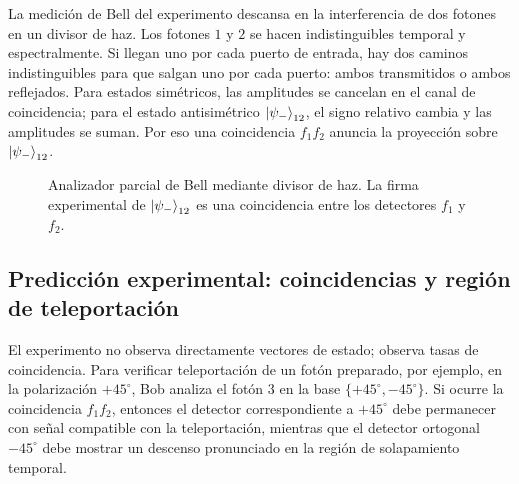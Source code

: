 \documentclass[12pt,a4paper]{article}
\theoremstyle{definition}
\theoremstyle{plain}
\theoremstyle{remark}
\begin{document}
La medición de Bell del experimento descansa en la interferencia de dos fotones en un divisor de haz. Los fotones $1$ y $2$ se hacen indistinguibles temporal y espectralmente. Si llegan uno por cada puerto de entrada, hay dos caminos indistinguibles para que salgan uno por cada puerto: ambos transmitidos o ambos reflejados. Para estados simétricos, las amplitudes se cancelan en el canal de coincidencia; para el estado antisimétrico $\ket{\psi_-}_{12}$, el signo relativo cambia y las amplitudes se suman. Por eso una coincidencia $f_1f_2$ anuncia la proyección sobre $\ket{\psi_-}_{12}$.

\begin{figure}[htbp]
    \centering
    \shorthandoff{<>}
    \caption{Analizador parcial de Bell mediante divisor de haz. La firma experimental de $\ket{\psi_-}_{12}$ es una coincidencia entre los detectores $f_1$ y $f_2$.}
    \label{fig:bsm-beamsplitter}
\end{figure}

\subsection{Predicción experimental: coincidencias y región de teleportación}

El experimento no observa directamente vectores de estado; observa tasas de coincidencia. Para verificar teleportación de un fotón preparado, por ejemplo, en la polarización $+45^\circ$, Bob analiza el fotón $3$ en la base $\{+45^\circ,-45^\circ\}$. Si ocurre la coincidencia $f_1f_2$, entonces el detector correspondiente a $+45^\circ$ debe permanecer con señal compatible con la teleportación, mientras que el detector ortogonal $-45^\circ$ debe mostrar un descenso pronunciado en la región de solapamiento temporal.
\end{document}
